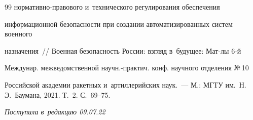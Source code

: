 {{\begin{thebibliography}{99}
нор\-ма\-тив\-но-пра\-во\-во\-го и~технического регулирования обеспечения 


информационной безопас\-ности при создании автоматизированных систем военного 


назначения~/\!\!/ Военная безопас\-ность России: взгляд в~будущее: Мат-лы 6-й 


Междунар. межведомственной научн.-практич. конф. научного отделения №\,10 


Российской академии ракетных и~артиллерийских наук.~--- М.: МГТУ им.\ Н.\,Э.~Баумана, 2021. Т.~2. С.~69--75.





       \end{thebibliography}


} }











\vspace*{-3pt}





\hfill{\small\textit{Поступила в~редакцию 09.07.22}}




















\newpage





\vspace*{-28pt}















\def\tit{PROBLEMS AND THREATS\\ OF~SOME NEW DIGITAL TECHNOLOGIES IMPLEMENTATION}











